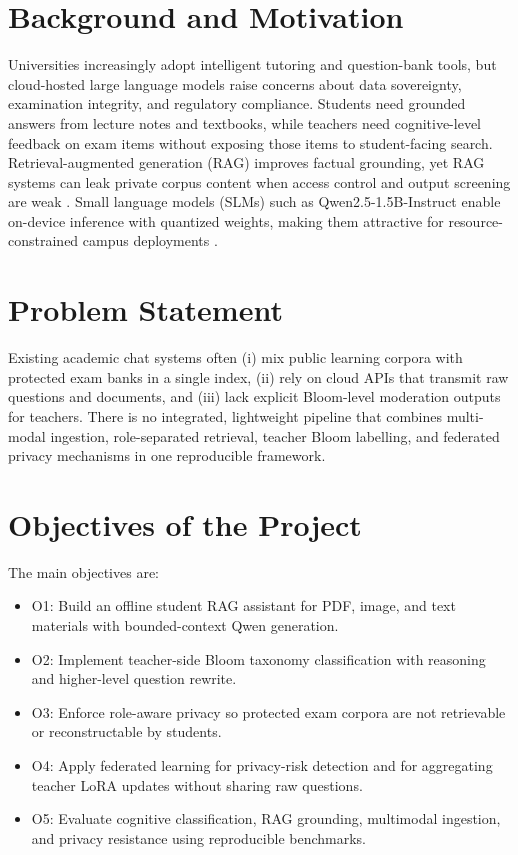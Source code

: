 
\section{Background and Motivation}
Universities increasingly adopt intelligent tutoring and question-bank tools, but cloud-hosted large language models raise concerns about data sovereignty, examination integrity, and regulatory compliance. Students need grounded answers from lecture notes and textbooks, while teachers need cognitive-level feedback on exam items without exposing those items to student-facing search. Retrieval-augmented generation (RAG) improves factual grounding, yet RAG systems can leak private corpus content when access control and output screening are weak \cite{good_bad_rag,beyond_text_mrag_privacy}. Small language models (SLMs) such as Qwen2.5-1.5B-Instruct enable on-device inference with quantized weights, making them attractive for resource-constrained campus deployments \cite{tinyllama,qlora}.

\section{Problem Statement}
Existing academic chat systems often (i) mix public learning corpora with protected exam banks in a single index, (ii) rely on cloud APIs that transmit raw questions and documents, and (iii) lack explicit Bloom-level moderation outputs for teachers. There is no integrated, lightweight pipeline that combines multi-modal ingestion, role-separated retrieval, teacher Bloom labelling, and federated privacy mechanisms in one reproducible framework.

\section{Objectives of the Project}
The main objectives are:
\begin{itemize}
    \item O1: Build an offline student RAG assistant for PDF, image, and text materials with bounded-context Qwen generation.
    \item O2: Implement teacher-side Bloom taxonomy classification with reasoning and higher-level question rewrite.
    \item O3: Enforce role-aware privacy so protected exam corpora are not retrievable or reconstructable by students.
    \item O4: Apply federated learning for privacy-risk detection and for aggregating teacher LoRA updates without sharing raw questions.
    \item O5: Evaluate cognitive classification, RAG grounding, multimodal ingestion, and privacy resistance using reproducible benchmarks.
\end{itemize}

